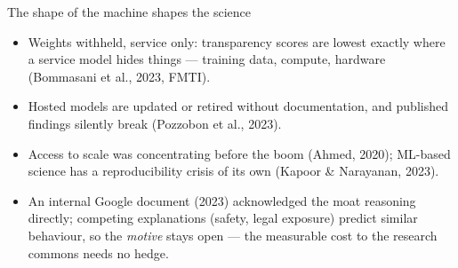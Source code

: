 \documentclass[11pt]{beamer}
\begin{document}
\begin{frame}{The shape of the machine shapes the science}
  \begin{itemize}
    \item Weights withheld, service only: transparency scores are lowest
          exactly where a service model hides things --- training data,
          compute, hardware (Bommasani et al., 2023, FMTI).
    \item Hosted models are updated or retired without documentation, and
          published findings silently break (Pozzobon et al., 2023).
    \item Access to scale was concentrating before the boom (Ahmed, 2020);
          ML-based science has a reproducibility crisis of its own
          (Kapoor \& Narayanan, 2023).
    \item An internal Google document (2023) acknowledged the moat
          reasoning directly; competing explanations (safety, legal
          exposure) predict similar behaviour, so the \emph{motive} stays
          open --- the measurable cost to the research commons needs no
          hedge.
  \end{itemize}
\end{frame}
\end{document}
